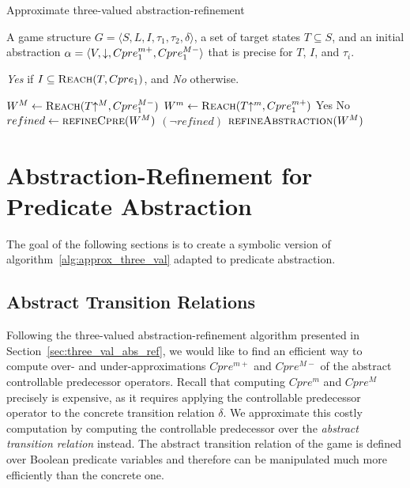 \begin{algorithm}
\caption{Approximate three-valued abstraction-refinement}
\label{alg:approx_three_val}

\begin{algorithmic}[1]

 A game structure $G = \langle S, L, I, \tau_1, \tau_2, \delta \rangle$, a set of target states $T\subseteq S$, and an initial abstraction $\alpha=\langle V, \mathord{\downarrow}, Cpre_1^{m+}, Cpre_1^{M-} \rangle$ that is precise for $T$, $I$, and $\tau_i$.

 {\it Yes} if $I \subseteq \textsc{Reach}(T, Cpre_1)$, and {\it No} otherwise.

    \Loop
        \State $W^M \gets \textsc{Reach}(T\mathord{\uparrow^M}, Cpre_1^{M-})$
        \State $W^m \gets \textsc{Reach}(T\mathord{\uparrow^m}, Cpre_1^{m+})$
         \Return Yes \label{alg:atv:t1}
         \Return No \label{alg:atv:t2}
        \Else       
            \State $refined \gets \Call{refineCpre}{W^M}$
            \State \algorithmicif{} {$(\neg refined)$}
                $\Call{refineAbstraction}{W^M}$
            \algorithmicend \algorithmicif
        \EndIf
    \EndLoop
\EndFunction

\end{algorithmic}
\end{algorithm}

\section{Abstraction-Refinement for Predicate Abstraction}

The goal of the following sections is to create a symbolic version of algorithm~\ref{alg:approx_three_val} adapted to predicate abstraction.

\subsection{Abstract Transition Relations}
\label{s:cpre}

Following the three-valued abstraction-refinement algorithm presented in Section~\ref{sec:three_val_abs_ref}, we would like to find an efficient way to compute over- and under-approximations $Cpre^{m+}$ and $Cpre^{M-}$ of the abstract controllable predecessor operators. Recall that computing $Cpre^m$ and $Cpre^M$ precisely is expensive, as it requires applying the controllable predecessor operator to the concrete transition relation $\delta$. We approximate this costly computation by computing the controllable predecessor over the \emph{abstract transition relation} instead. The abstract transition relation of the game is defined over Boolean predicate variables and therefore can be manipulated much more efficiently than the concrete one.

